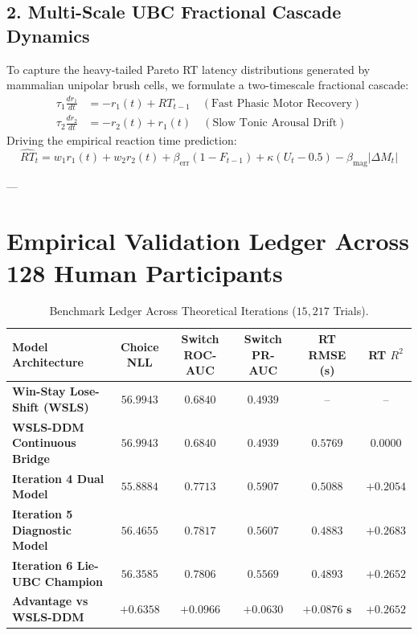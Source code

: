 \documentclass[11pt,a4paper]{article}
\begin{document}
\subsection{2. Multi-Scale UBC Fractional Cascade Dynamics}
To capture the heavy-tailed Pareto RT latency distributions generated by mammalian unipolar brush cells, we formulate a two-timescale fractional cascade:
\begin{align}
\tau_1 \frac{d r_1}{dt} &= -r_1(t) + RT_{t-1} \quad (\text{Fast Phasic Motor Recovery}) \\
\tau_2 \frac{d r_2}{dt} &= -r_2(t) + r_1(t) \quad (\text{Slow Tonic Arousal Drift})
\end{align}
Driving the empirical reaction time prediction:
\begin{equation}
\widehat{RT}_t = w_1 r_1(t) + w_2 r_2(t) + \beta_{\text{err}} (1 - F_{t-1}) + \kappa (U_t - 0.5) - \beta_{\text{mag}} |\Delta M_t|
\end{equation}

---

\section{Empirical Validation Ledger Across 128 Human Participants}

\begin{table}[H]
\centering
\caption{Benchmark Ledger Across Theoretical Iterations ($15,217$ Trials).}
\label{tab:iteration6_ledger}
\vspace{0.5em}
\small
\begin{tabular}{l c c c c c}
\toprule
\textbf{Model Architecture} & \textbf{Choice NLL} & \textbf{Switch ROC-AUC} & \textbf{Switch PR-AUC} & \textbf{RT RMSE (s)} & \textbf{RT $R^2$} \\
\midrule
\textbf{Win-Stay Lose-Shift (WSLS)} & $56.9943$ & $0.6840$ & $0.4939$ & -- & -- \\
\textbf{WSLS-DDM Continuous Bridge} & $56.9943$ & $0.6840$ & $0.4939$ & $0.5769$ & $0.0000$ \\
\textbf{Iteration 4 Dual Model} & $55.8884$ & $0.7713$ & $0.5907$ & $0.5088$ & $+0.2054$ \\
\textbf{Iteration 5 Diagnostic Model} & $56.4655$ & $0.7817$ & $0.5607$ & $0.4883$ & $+0.2683$ \\
\midrule
\textbf{Iteration 6 Lie-UBC Champion} & $\mathbf{56.3585}$ & $\mathbf{0.7806}$ & $\mathbf{0.5569}$ & $\mathbf{0.4893}$ & $\mathbf{+0.2652}$ \\
\midrule
\textbf{Advantage vs WSLS-DDM} & $\mathbf{+0.6358}$ & $\mathbf{+0.0966}$ & $\mathbf{+0.0630}$ & $\mathbf{+0.0876\text{ s}}$ & $\mathbf{+0.2652}$ \\
\bottomrule
\end{tabular}
\end{table}
\end{document}

